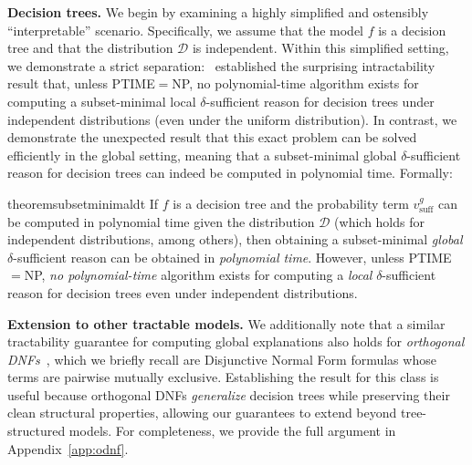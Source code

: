 \documentclass{article}
\newtheorem{theorem}{Theorem}
\newtheorem{remark}{Remark}
\begin{document}
\textbf{Decision trees.} We begin by examining a highly simplified and ostensibly ``interpretable'' scenario. Specifically, we assume that the model $f$ is a decision tree and that the distribution $\mathcal{D}$ is independent. Within this simplified setting, we demonstrate a strict separation:~\cite{arenas2022computing} established the surprising intractability result that, unless PTIME$=$NP, no polynomial-time algorithm exists for computing a subset-minimal local $\delta$-sufficient reason for decision trees under independent distributions (even under the uniform distribution). In contrast, we demonstrate the unexpected result that this exact problem can be solved efficiently in the global setting, meaning that a subset-minimal global $\delta$-sufficient reason for decision trees can indeed be computed in polynomial time. Formally:


\begin{restatable}
{theorem}{subsetminimaldt}\label{subset_minimal_dt_theor}
If $f$ is a decision tree and the probability term $v^{g}_{\text{suff}}$ can be computed in polynomial time given the distribution $\mathcal{D}$ (which holds for independent distributions, among others), then obtaining a subset-minimal \emph{global} $ \delta $-sufficient reason can be obtained in \emph{polynomial time}. However, unless PTIME$=$NP, \emph{no polynomial-time} algorithm exists for computing a \emph{local}  $\delta$-sufficient reason for decision trees even under independent distributions.
\end{restatable}

\textbf{Extension to other tractable models.} We additionally note that a similar tractability guarantee for computing global explanations also holds for \emph{orthogonal DNFs}~\citep{crama2011boolean}, which we briefly recall are Disjunctive Normal Form formulas whose terms are pairwise mutually exclusive. Establishing the result for this class is useful because orthogonal DNFs \emph{generalize} decision trees while preserving their clean structural properties, allowing our guarantees to extend beyond tree-structured models. For completeness, we provide the full argument in Appendix~\ref{app:odnf}.



\end{document}
